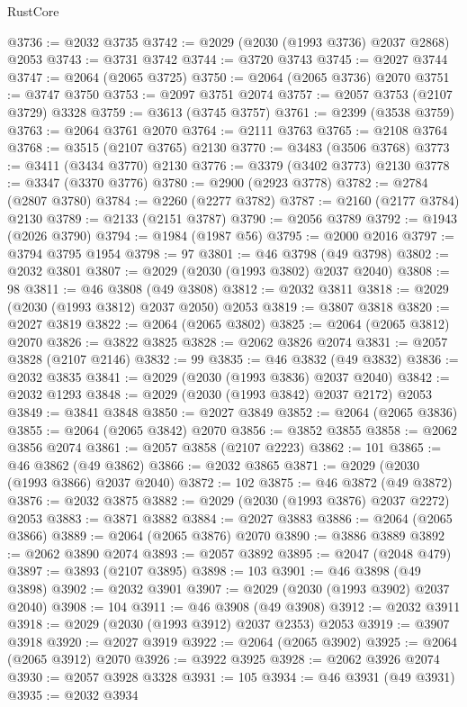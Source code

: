 \begin{lexlean}{RustCore}
\begin{coremodule}
@3736 := @2032 @3735
@3742 := @2029 (@2030 (@1993 @3736) @2037 @2868) @2053
@3743 := @3731 @3742
@3744 := @3720 @3743
@3745 := @2027 @3744
@3747 := @2064 (@2065 @3725)
@3750 := @2064 (@2065 @3736) @2070
@3751 := @3747 @3750
@3753 := @2097 @3751 @2074
@3757 := @2057 @3753 (@2107 @3729) @3328
@3759 := @3613 (@3745 @3757)
@3761 := @2399 (@3538 @3759)
@3763 := @2064 @3761 @2070
@3764 := @2111 @3763
@3765 := @2108 @3764
@3768 := @3515 (@2107 @3765) @2130
@3770 := @3483 (@3506 @3768)
@3773 := @3411 (@3434 @3770) @2130
@3776 := @3379 (@3402 @3773) @2130
@3778 := @3347 (@3370 @3776)
@3780 := @2900 (@2923 @3778)
@3782 := @2784 (@2807 @3780)
@3784 := @2260 (@2277 @3782)
@3787 := @2160 (@2177 @3784) @2130
@3789 := @2133 (@2151 @3787)
@3790 := @2056 @3789
@3792 := @1943 (@2026 @3790)
@3794 := @1984 (@1987 @56)
@3795 := @2000 @2016
@3797 := @3794 @3795 @1954
@3798 := 97
@3801 := @46 @3798 (@49 @3798)
@3802 := @2032 @3801
@3807 := @2029 (@2030 (@1993 @3802) @2037 @2040)
@3808 := 98
@3811 := @46 @3808 (@49 @3808)
@3812 := @2032 @3811
@3818 := @2029 (@2030 (@1993 @3812) @2037 @2050) @2053
@3819 := @3807 @3818
@3820 := @2027 @3819
@3822 := @2064 (@2065 @3802)
@3825 := @2064 (@2065 @3812) @2070
@3826 := @3822 @3825
@3828 := @2062 @3826 @2074
@3831 := @2057 @3828 (@2107 @2146)
@3832 := 99
@3835 := @46 @3832 (@49 @3832)
@3836 := @2032 @3835
@3841 := @2029 (@2030 (@1993 @3836) @2037 @2040)
@3842 := @2032 @1293
@3848 := @2029 (@2030 (@1993 @3842) @2037 @2172) @2053
@3849 := @3841 @3848
@3850 := @2027 @3849
@3852 := @2064 (@2065 @3836)
@3855 := @2064 (@2065 @3842) @2070
@3856 := @3852 @3855
@3858 := @2062 @3856 @2074
@3861 := @2057 @3858 (@2107 @2223)
@3862 := 101
@3865 := @46 @3862 (@49 @3862)
@3866 := @2032 @3865
@3871 := @2029 (@2030 (@1993 @3866) @2037 @2040)
@3872 := 102
@3875 := @46 @3872 (@49 @3872)
@3876 := @2032 @3875
@3882 := @2029 (@2030 (@1993 @3876) @2037 @2272) @2053
@3883 := @3871 @3882
@3884 := @2027 @3883
@3886 := @2064 (@2065 @3866)
@3889 := @2064 (@2065 @3876) @2070
@3890 := @3886 @3889
@3892 := @2062 @3890 @2074
@3893 := @2057 @3892
@3895 := @2047 (@2048 @479)
@3897 := @3893 (@2107 @3895)
@3898 := 103
@3901 := @46 @3898 (@49 @3898)
@3902 := @2032 @3901
@3907 := @2029 (@2030 (@1993 @3902) @2037 @2040)
@3908 := 104
@3911 := @46 @3908 (@49 @3908)
@3912 := @2032 @3911
@3918 := @2029 (@2030 (@1993 @3912) @2037 @2353) @2053
@3919 := @3907 @3918
@3920 := @2027 @3919
@3922 := @2064 (@2065 @3902)
@3925 := @2064 (@2065 @3912) @2070
@3926 := @3922 @3925
@3928 := @2062 @3926 @2074
@3930 := @2057 @3928 @3328
@3931 := 105
@3934 := @46 @3931 (@49 @3931)
@3935 := @2032 @3934

\end{coremodule}
\end{lexlean}

